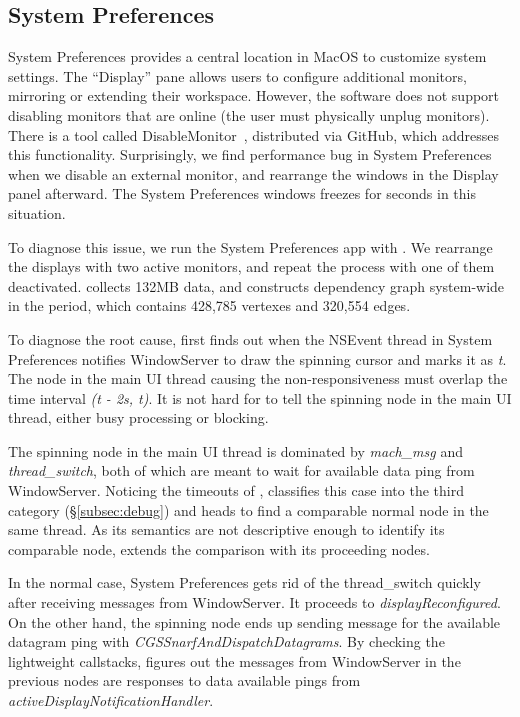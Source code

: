 \subsection{System Preferences}

System Preferences provides a central location in MacOS to customize system
settings. The ``Display'' pane allows users to configure additional monitors,
mirroring or extending their workspace. However, the software does not support
disabling monitors that are online (the user must physically unplug monitors).
There is a tool called DisableMonitor~\cite{disablemonitor}, distributed via
GitHub, which addresses this functionality. Surprisingly, we find performance
bug in System Preferences when we disable an external monitor, and rearrange
the windows in the Display panel afterward. The System Preferences windows
freezes for seconds in this situation.

To diagnose this issue, we run the System Preferences app with \xxx. We
rearrange the displays with two active monitors, and repeat the process with
one of them deactivated. \xxx collects 132MB data, and constructs dependency
graph system-wide in the period, which contains 428,785 vertexes and 320,554
edges.

To diagnose the root cause, \xxx first finds out when the NSEvent thread in
System Preferences notifies WindowServer to draw the spinning cursor and marks
it as \textit{t}. The node in the main UI thread causing the non-responsiveness
must overlap the time interval \textit{(t - 2s, t)}. It is not hard for
\xxx to tell the spinning node in the main UI thread, either busy processing or
blocking.

The spinning node in the main UI thread is dominated by \textit{mach\_msg} and
\textit{thread\_switch}, both of which are meant to wait for available data
ping from WindowServer. Noticing the timeouts of , \xxx
classifies this case into the third category (\S\ref{subsec:debug}) and heads
to find a comparable normal node in the same thread. As its semantics are not
descriptive enough to identify its comparable node, \xxx extends the comparison
with its proceeding nodes.

In the normal case, System Preferences gets rid of the thread\_switch
quickly after receiving messages from WindowServer. It proceeds
to \textit{displayReconfigured}. On the other hand, the spinning
node ends up sending message for the available datagram ping with
\textit{CGSSnarfAndDispatchDatagrams}. By checking the lightweight callstacks,
\xxx figures out the messages from WindowServer in the previous nodes are
responses to data available pings from \textit{activeDisplayNotificationHandler}.

